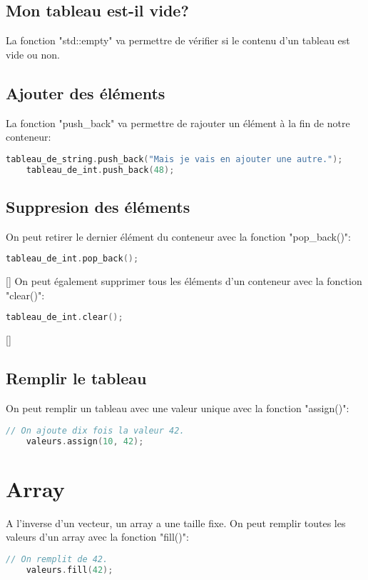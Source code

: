 \documentclass{article}
\begin{document}
\subsection{Mon tableau est-il vide?}
La fonction "std::empty" va permettre de vérifier si le contenu d'un tableau est vide ou non.

\subsection{Ajouter des éléments}
La fonction "push\_back" va permettre de rajouter un élément à la fin de notre conteneur:
\begin{lstlisting}[language=C++]
    tableau_de_string.push_back("Mais je vais en ajouter une autre.");
    tableau_de_int.push_back(48);
\end{lstlisting}{}

\subsection{Suppresion des éléments}
On peut retirer le dernier élément du conteneur avec la fonction "pop\_back()":
\begin{lstlisting}[language=C++]
    tableau_de_int.pop_back();
\end{lstlisting}[]
On peut également supprimer tous les éléments d'un conteneur avec la fonction "clear()":
\begin{lstlisting}[language=c++]
     tableau_de_int.clear();
\end{lstlisting}[]

\subsection{Remplir le tableau}
On peut remplir un tableau avec une valeur unique avec la fonction "assign()":
\begin{lstlisting}[language=C++]
    // On ajoute dix fois la valeur 42.
    valeurs.assign(10, 42);
\end{lstlisting}


\section{Array}
A l'inverse d'un vecteur, un array a une taille fixe. On peut remplir toutes les valeurs d'un array avec la fonction "fill()":

\begin{lstlisting}[language=C++]
    // On remplit de 42.
    valeurs.fill(42);
\end{lstlisting}{}
\end{document}

